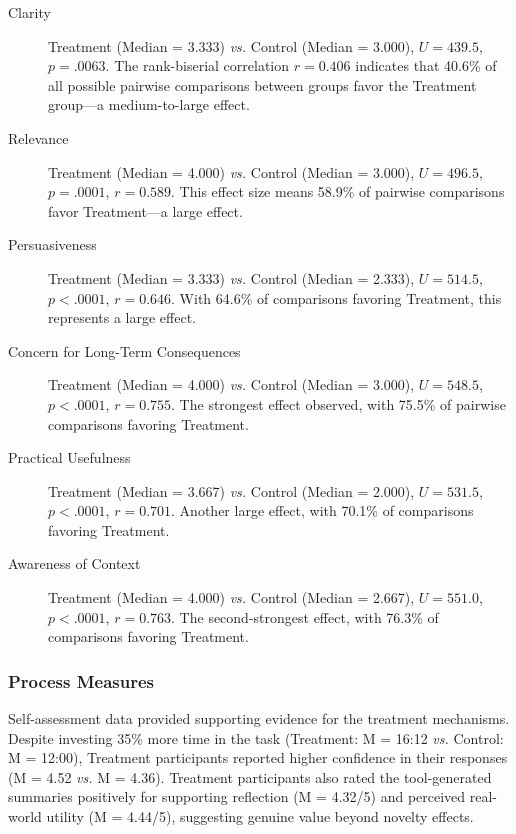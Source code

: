 \begin{description}
  \item [Clarity] Treatment (Median = 3.333) \textit{vs.} Control (Median = 3.000), $U = 439.5$, $p = .0063$. The rank-biserial correlation $r = 0.406$ indicates that 40.6\% of all possible pairwise comparisons between groups favor the Treatment group—a medium-to-large effect.

  \item [Relevance] Treatment (Median = 4.000) \textit{vs.} Control (Median = 3.000), $U = 496.5$, $p = .0001$, $r = 0.589$. This effect size means 58.9\% of pairwise comparisons favor Treatment—a large effect.

  \item [Persuasiveness] Treatment (Median = 3.333) \textit{vs.} Control (Median = 2.333), $U = 514.5$, $p < .0001$, $r = 0.646$. With 64.6\% of comparisons favoring Treatment, this represents a large effect.

  \item [Concern for Long-Term Consequences] Treatment (Median = 4.000) \textit{vs.} Control (Median = 3.000), $U = 548.5$, $p < .0001$, $r = 0.755$. The strongest effect observed, with 75.5\% of pairwise comparisons favoring Treatment.

  \item [Practical Usefulness] Treatment (Median = 3.667) \textit{vs.} Control (Median = 2.000), $U = 531.5$, $p < .0001$, $r = 0.701$. Another large effect, with 70.1\% of comparisons favoring Treatment.

  \item [Awareness of Context] Treatment (Median = 4.000) \textit{vs.} Control (Median = 2.667), $U = 551.0$, $p < .0001$, $r = 0.763$. The second-strongest effect, with 76.3\% of comparisons favoring Treatment.
\end{description}

\subsubsection*{Process Measures}

Self-assessment data provided supporting evidence for the treatment mechanisms. Despite investing 35\% more time in the task (Treatment: M = 16:12 \textit{vs.} Control: M = 12:00), Treatment participants reported higher confidence in their responses (M = 4.52 \textit{vs.} M = 4.36). Treatment participants also rated the tool-generated summaries positively for supporting reflection (M = 4.32/5) and perceived real-world utility (M = 4.44/5), suggesting genuine value beyond novelty effects.

